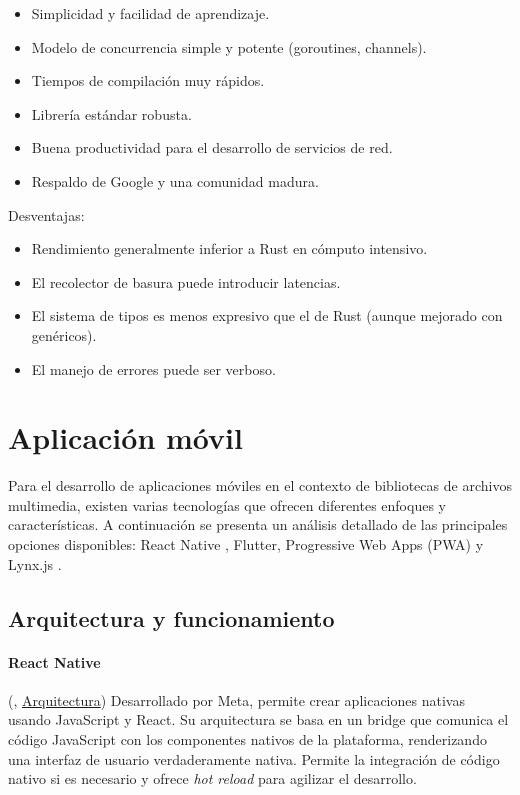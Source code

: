 \begin{itemize}
    \item Simplicidad y facilidad de aprendizaje.
    \item Modelo de concurrencia simple y potente (goroutines, channels).
    \item Tiempos de compilación muy rápidos.
    \item Librería estándar robusta.
    \item Buena productividad para el desarrollo de servicios de red.
    \item Respaldo de Google y una comunidad madura.
\end{itemize}
Desventajas:
\begin{itemize}
    \item Rendimiento generalmente inferior a Rust en cómputo intensivo.
    \item El recolector de basura puede introducir latencias.
    \item El sistema de tipos es menos expresivo que el de Rust (aunque mejorado con genéricos).
    \item El manejo de errores puede ser verboso.
\end{itemize}


\section{Aplicación móvil}

Para el desarrollo de aplicaciones móviles en el contexto de bibliotecas de archivos multimedia, existen varias tecnologías que ofrecen diferentes enfoques y características. A continuación se presenta un análisis detallado de las principales opciones disponibles: React Native \parencite{danielsson2016reactnative}, Flutter, Progressive Web Apps (PWA) \parencite{tandel2018impact} y Lynx.js \parencite{danielsson2016reactnative} \parencite{lynx-documentation}.

\subsection{Arquitectura y funcionamiento}

\paragraph{React Native}
(\cite{react-native-documentation}, \href{https://reactnative.dev/architecture/overview}{Arquitectura}) Desarrollado por Meta, permite crear aplicaciones nativas usando JavaScript y React. Su arquitectura se basa en un \gls{bridge} que comunica el código JavaScript con los componentes nativos de la plataforma, renderizando una interfaz de usuario verdaderamente nativa. Permite la integración de código nativo si es necesario y ofrece \textit{hot reload} para agilizar el desarrollo.

